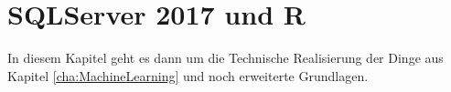 \chapter{SQLServer 2017 und R}
\label{cha:SQLServer}
\label{cha:R}
In diesem Kapitel geht es dann um die Technische Realisierung der Dinge aus Kapitel \ref{cha:MachineLearning} und noch erweiterte Grundlagen.


